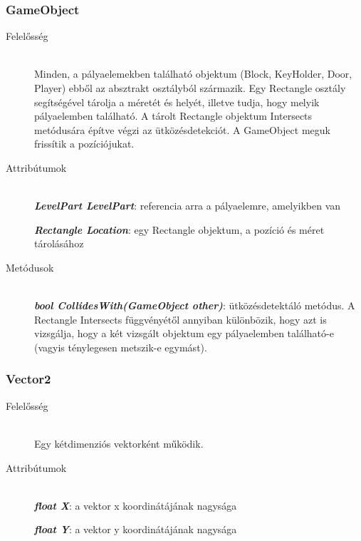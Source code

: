 \subsubsection{GameObject}
	\begin{description}
		\item[Felelősség] \hfill \\
		Minden, a pályaelemekben található objektum (Block, KeyHolder, Door, Player) ebből az absztrakt osztályból származik. Egy Rectangle osztály segítségével tárolja a méretét és helyét, illetve tudja, hogy melyik pályaelemben található. A tárolt Rectangle objektum Intersects metódusára építve végzi az ütközésdetekciót. A GameObject meguk frissítik a pozíciójukat.
		
		\item[Attribútumok]\hfill \\
		\textbf{\emph{LevelPart LevelPart}}: referencia arra a pályaelemre, amelyikben van
		
		\textbf{\emph{Rectangle Location}}: egy Rectangle objektum, a pozíció és méret tárolásához
		
		\item[Metódusok]\hfill \\
		\textbf{\emph{bool CollidesWith(GameObject other)}}: ütközésdetektáló metódus. A Rectangle Intersects függvényétől annyiban különbözik, hogy azt is vizsgálja, hogy a két vizsgált objektum egy pályaelemben található-e (vagyis ténylegesen metszik-e egymást).
						
	\end{description}

\subsubsection{Vector2}
	\begin{description}
	\item[Felelősség] \hfill \\
	Egy kétdimenziós vektorként működik.
	\item[Attribútumok] \hfill \\
	\textbf{\emph{float X}}: a vektor x koordinátájának nagysága
	
	\textbf{\emph{float Y}}: a vektor y koordinátájának nagysága
	\end{description}

